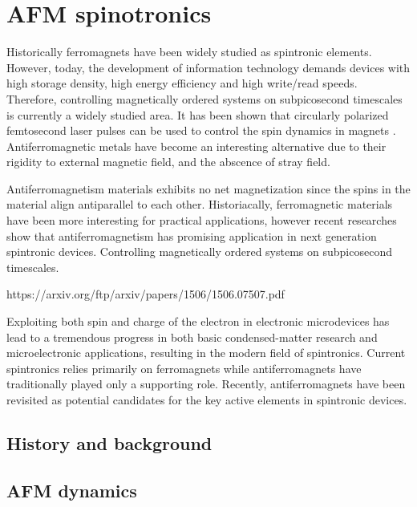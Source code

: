 \chapter{AFM spinotronics}
Historically ferromagnets have been widely studied as spintronic elements. However, today, the development of information technology demands devices with high storage density, high energy efficiency and high write/read speeds. Therefore, controlling magnetically ordered systems on subpicosecond timescales is currently a widely studied area. It has been shown that circularly polarized femtosecond laser pulses can be used to control the spin dynamics in magnets \cite{Kimel2005}. Antiferromagnetic metals have become an interesting alternative due to their rigidity to external magnetic field, and the abscence of stray field.

Antiferromagnetism materials exhibits no net magnetization since the spins in the material align antiparallel to each other. Historiacally, ferromagnetic materials have been more interesting for practical applications, however recent researches show that antiferromagnetism has promising application in next generation spintronic devices. Controlling magnetically ordered systems on subpicosecond timescales.

https://arxiv.org/ftp/arxiv/papers/1506/1506.07507.pdf

Exploiting both spin and charge of the electron in electronic microdevices has lead to a tremendous progress in both basic
condensed-matter research and microelectronic applications, resulting in the modern field of spintronics. Current spintronics
relies primarily on ferromagnets while antiferromagnets have traditionally played only a supporting role. Recently,
antiferromagnets have been revisited as potential candidates for the key active elements in spintronic devices.

\section{History and background}

\section{AFM dynamics}
